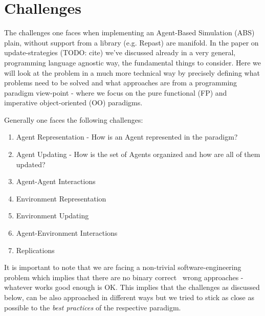 \chapter{Challenges}

The challenges one faces when implementing an Agent-Based Simulation (ABS) plain, without support from a library (e.g. Repast) are manifold. In the paper on update-strategies (TODO: cite) we've discussed already in a very general, programming language agnostic way, the fundamental things to consider. Here we will look at the problem in a much more technical way by precisely defining what problems need to be solved and what approaches are from a programming paradigm view-point - where we focus on the pure functional (FP) and imperative object-oriented (OO) paradigms.

Generally one faces the following challenges:

\begin{enumerate}
	\item Agent Representation - How is an Agent represented in the paradigm?
	\item Agent Updating - How is the set of Agents organized and how are all of them updated?
	\item Agent-Agent Interactions 
	\item Environment Representation
	\item Environment Updating
	\item Agent-Environment Interactions
	\item Replications
\end{enumerate}

It is important to note that we are facing a non-trivial software-engineering problem which implies that there are no binary correct \ wrong approaches - whatever works good enough is OK. This implies that the challenges as discussed below, can be also approached in different ways but we tried to stick as close as possible to the \textit{best practices} of the respective paradigm.